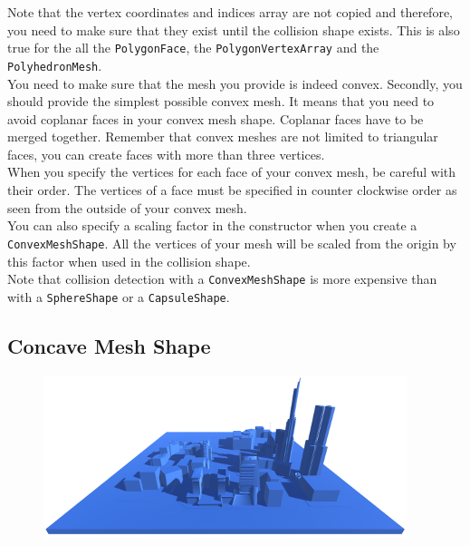 \documentclass[a4paper,12pt]{article}
\begin{document}
    \vspace{0.6cm}

    Note that the vertex coordinates and indices array are not copied and therefore, you need to make sure that they exist until the collision shape exists. This is also true for
    the all the \texttt{PolygonFace}, the \texttt{PolygonVertexArray} and the \texttt{PolyhedronMesh}. \\

    You need to make sure that the mesh you provide is indeed convex. Secondly, you should provide the simplest possible convex mesh. It means that you need to avoid
    coplanar faces in your convex mesh shape. Coplanar faces have to be merged together. Remember that convex meshes are not limited to triangular faces, you can
    create faces with more than three vertices. \\

    When you specify the vertices for each face of your convex mesh, be careful with their order. The vertices of a face must be specified in counter clockwise order
    as seen from the outside of your convex mesh. \\

    You can also specify a scaling factor in the constructor when you create a \texttt{ConvexMeshShape}. All the vertices of your mesh will be scaled from the origin by this factor
    when used in the collision shape. \\

    Note that collision detection with a \texttt{ConvexMeshShape} is more expensive than with a \texttt{SphereShape} or a \texttt{CapsuleShape}. \\

  \subsection{Concave Mesh Shape}

  \begin{figure}[h]
      \centering
      \includegraphics{concavemeshshape.png}
      \label{fig:concaveshape}
  \end{figure}
\end{document}
